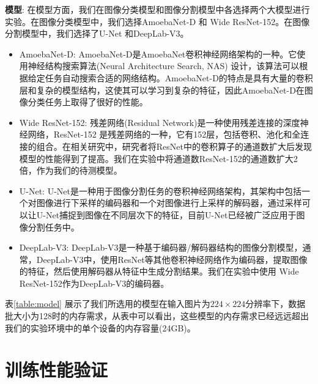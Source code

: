 \noindent\textbf{模型}: 在模型方面，我们在图像分类模型和图像分割模型中各选择两个大模型进行实验。在图像分类模型中，我们选择AmoebaNet-D 和 Wide ResNet-152。在图像分割模型中，我们选择了U-Net 和DeepLab-V3。
\begin{itemize}
	\item AmoebaNet-D: AmoebaNet-D是AmoebaNet卷积神经网络架构的一种。它使用神经结构搜索算法(Neural Architecture Search, NAS) 设计，该算法可以根据给定任务自动搜索合适的网络结构。AmoebaNet-D的特点是具有大量的卷积层和复杂的模型结构，这使其可以学习到复杂的特征，因此AmoebaNet-D在图像分类任务上取得了很好的性能。
	\item Wide ResNet-152: 残差网络(Residual Network)是一种使用残差连接的深度神经网络，ResNet-152 是残差网络的一种，它有152层，包括卷积、池化和全连接的组合。在相关研究中，研究者将ResNet中的卷积算子的通道数扩大后发现模型的性能得到了提高。我们在实验中将通道数ResNet-152的通道数扩大2倍，作为我们的待测模型。
	\item U-Net: U-Net是一种用于图像分割任务的卷积神经网络架构，其架构中包括一个对图像进行下采样的编码器和一个对图像进行上采样的解码器，通过采样可以让U-Net捕捉到图像在不同层次下的特征，目前U-Net已经被广泛应用于图像分割任务中。
	\item DeepLab-V3: DeepLab-V3是一种基于编码器/解码器结构的图像分割模型，通常，DeepLab-V3中，使用ResNet等其他卷积神经网络作为编码器，提取图像的特征，然后使用解码器从特征中生成分割结果。我们在实验中使用 Wide ResNet-152作为DeepLab-V3的编码器。
\end{itemize}
表\ref{table:model} 展示了我们所选用的模型在输入图片为$224\times 224$分辨率下，数据批大小为128时的内存需求，从表中可以看出，这些模型的内存需求已经远远超出我们的实验环境中的单个设备的内存容量(24GB)。




\section{训练性能验证}
\label{sec:performace}
